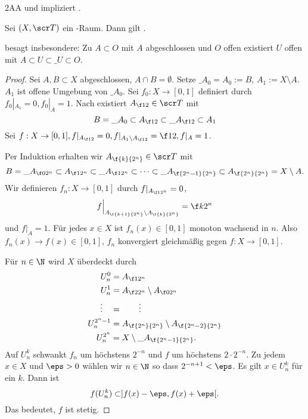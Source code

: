 \begin{lem}[Tychonoff]
	2AA und  impliziert .
\end{lem}

\begin{st}[Urysohn]
	Sei $(X, \scr T)$ ein -Raum.
	Dann gilt .
	\begin{note}
		 besagt insbesondere:
		Zu $A \subset O$ mit $A$ abgeschlossen und $O$ offen existiert $U$ offen mit $A \subset U \subset  \_{U} \subset O$.
	\end{note}
	\begin{proof}
		Sei $A, B \subset X$ abgeschlossen, $A \cap B = \emptyset$.
		Setze $\_{A_0} = A_0 := B$, $A_1 := X \setminus A$.
		$A_1$ ist offene Umgebung von $\_{A_0}$.
		Sei $f_0: X \to [0,1]$ definiert durch $f_0|_{A_1} = 0, f_0|_{A} = 1$.
		Nach  existiert $A_{\f 12} \in \scr T$ mit
		\[
			B = \_{A_0} \subset A_{\f 12} \subset \_{A_{\f 12}} \subset A_1
		\]
		Sei $f: X \to [0,1], f|_{A_{\f 12}} = 0, f|_{A_1 \setminus A_{\f 12}} = \f 12, f|_A = 1$.

		Per Induktion erhalten wir $A_{\f {k}{2^n}} \in \scr T$ mit
		\[
			B = \_{A_{\f 0{2^n}}} \subset A_{\f 1{2^n}} \subset \_{A_{\f 1{2^n}}}
			\subset \dotsb \subset
			\_{A_{\f{2^n - 1}{2^n}}}
			\subset A_{\f {2^n}{2^n}}
			= X \setminus A.
		\]
		Wir definieren $f_n : X \to [0,1]$ durch $f|_{A_{\f 1{2^n}}} = 0$,
		\[
			f\Big|_{A_{\f {k+1}{2^n}} \setminus A_{\f {k}{2^n}}}
			= \f k{2^n}
		\]
		und $f|_A = 1$.
		Für jedes $x \in X$ ist $f_n(x) \in [0,1]$ monoton wachsend in $n$.
		Also $f_n(x) \to f(x) \in [0,1]$, $f_n$ konvergiert gleichmäßig gegen $f: X \to [0,1]$.

		Für $n \in \N$ wird $X$ überdeckt durch
		\begin{align*}
			U_n^0 &= A_{\f 1{2^n}} \\
			U_n^1 &= A_{\f 2{2^n}} \setminus A_{\f 0{2^n}} \\
			\vdots \quad &= \qquad \vdots \\
			U_n^{2^n-1} &= A_{\f {2^n}{2^n}} \setminus A_{\f {2^n-2}{2^n}} \\
			U_n^{2^n} &= X \setminus \_{A_{\f {2^n-1}{2^n}}}.
		\end{align*}
		Auf $U_n^k$ schwankt $f_n$ um höchstens $2^{-n}$ und $f$ um höchstens $2\cdot 2^{-n}$.
		Zu jedem $x \in X$ und $\eps > 0$ wählen wir $n \in \N$ so dass $2^{-n+1} < \eps$.
		Es gilt $x \in U_n^k$ für ein $k$.
		Dann ist
		\[
			f(U_n^k) \subset ]f(x) - \eps, f(x) + \eps[.
		\]
		Das bedeutet, $f$ ist stetig.
	\end{proof}
\end{st}

